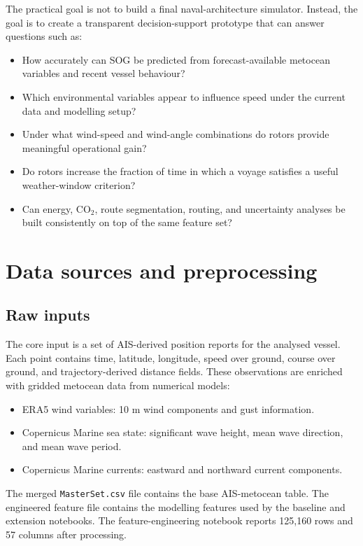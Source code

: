 \documentclass[10pt,a4paper]{article}
\newcommand{\co}{CO$_2$}
\newcommand{\sog}{SOG}
\begin{document}
The practical goal is not to build a final naval-architecture simulator. Instead,
the goal is to create a transparent decision-support prototype that can answer
questions such as:

\begin{itemize}
    \item How accurately can \sog{} be predicted from forecast-available
    metocean variables and recent vessel behaviour?
    \item Which environmental variables appear to influence speed under the
    current data and modelling setup?
    \item Under what wind-speed and wind-angle combinations do rotors provide
    meaningful operational gain?
    \item Do rotors increase the fraction of time in which a voyage satisfies a
    useful weather-window criterion?
    \item Can energy, \co{}, route segmentation, routing, and uncertainty
    analyses be built consistently on top of the same feature set?
\end{itemize}


\section{Data sources and preprocessing}

\subsection{Raw inputs}

The core input is a set of AIS-derived position reports for the analysed vessel.
Each point contains time, latitude, longitude, speed over ground, course over
ground, and trajectory-derived distance fields. These observations are enriched
with gridded metocean data from numerical models:

\begin{itemize}
    \item ERA5 wind variables: 10 m wind components and gust information.
    \item Copernicus Marine sea state: significant wave height, mean wave
    direction, and mean wave period.
    \item Copernicus Marine currents: eastward and northward current components.
\end{itemize}

The merged \texttt{MasterSet.csv} file contains the base AIS-metocean table.
The engineered feature file contains the modelling
features used by the baseline and extension notebooks. The feature-engineering
notebook reports 125,160 rows and 57 columns after processing.
\end{document}
